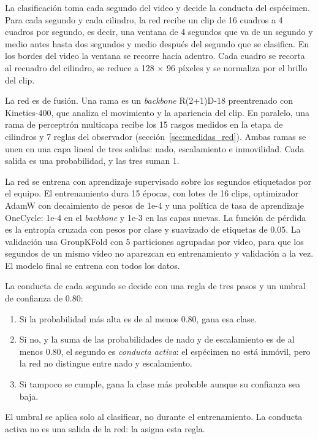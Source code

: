 La clasificación toma cada segundo del video y decide la conducta del espécimen. Para cada segundo y cada cilindro,
la red recibe un clip de 16 cuadros a 4 cuadros por segundo, es decir, una ventana de 4 segundos que va de un segundo
y medio antes hasta dos segundos y medio después del segundo que se clasifica. En los bordes del video la ventana se
recorre hacia adentro. Cada cuadro se recorta al recuadro del cilindro, se reduce a 128 × 96 píxeles y se normaliza
por el brillo del clip.

La red es de fusión. Una rama es un \textit{backbone} R(2+1)D-18 preentrenado con Kinetics-400, que analiza el
movimiento y la apariencia del clip. En paralelo, una rama de perceptrón multicapa recibe los 15 rasgos medidos en la
etapa de cilindros y 7 reglas del observador (sección~\ref{sec:medidas_red}). Ambas ramas se unen en una capa lineal de tres salidas: nado,
escalamiento e inmovilidad. Cada salida es una probabilidad, y las tres suman 1.

La red se entrena con aprendizaje supervisado sobre los segundos etiquetados por el equipo. El entrenamiento dura 15
épocas, con lotes de 16 clips, optimizador AdamW con decaimiento de pesos de 1e-4 y una política de tasa de
aprendizaje OneCycle: 1e-4 en el \textit{backbone} y 1e-3 en las capas nuevas. La función de pérdida es la entropía
cruzada con pesos por clase y suavizado de etiquetas de 0.05. La validación usa GroupKFold con 5 particiones
agrupadas por video, para que los segundos de un mismo video no aparezcan en entrenamiento y validación a la vez. El
modelo final se entrena con todos los datos.

La conducta de cada segundo se decide con una regla de tres pasos y un umbral de confianza de 0.80:

\begin{enumerate}
  \item Si la probabilidad más alta es de al menos 0.80, gana esa clase.
  \item Si no, y la suma de las probabilidades de nado y de escalamiento es de al menos 0.80, el segundo es
  \textit{conducta activa}: el espécimen no está inmóvil, pero la red no distingue entre nado y escalamiento.
  \item Si tampoco se cumple, gana la clase más probable aunque su confianza sea baja.
\end{enumerate}

El umbral se aplica solo al clasificar, no durante el entrenamiento. La conducta activa no es una salida de
la red: la asigna esta regla.

